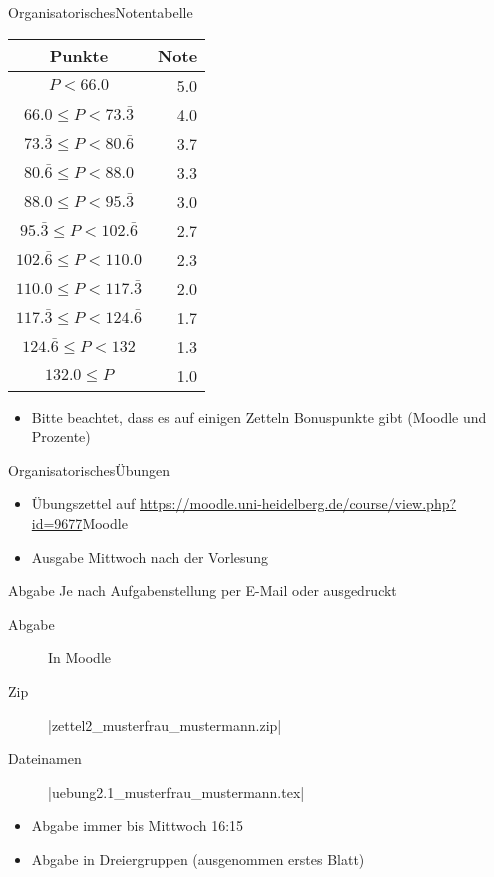 \documentclass[
	vorläufig=false,
	datum=2021-10-20,
	titel={Einführung und grundlegende Bedienung},
	web=true,
	max,
	aspectratio=1610,
]{../tex/latexkurs-slides}
\begin{document}
\begin{frame}[t]{Organisatorisches}{Notentabelle}
    \begin{table}[h!]
        \begin{center}
        \begin{tabular}{cr}
            \textbf{Punkte} & \textbf{Note}\\
            \hline
            \(P < 66.0\) & 5.0\\
            \(66.0 \leq P < 73.\bar{3}\) & 4.0\\
            \(73.\bar{3} \leq P < 80.\bar{6}\) & 3.7\\
            \(80.\bar{6} \leq P < 88.0\) & 3.3\\
            \(88.0 \leq P < 95.\bar{3}\) & 3.0\\
            \(95.\bar{3} \leq P < 102.\bar{6}\) & 2.7\\
            \(102.\bar{6} \leq P < 110.0\) & 2.3\\
            \(110.0 \leq P < 117.\bar{3}\) & 2.0\\
            \(117.\bar{3} \leq P < 124.\bar{6}\) & 1.7\\
            \(124.\bar{6} \leq P < 132\) & 1.3\\
            \(132.0 \leq P\) & 1.0
        \end{tabular}
        \end{center}
    \end{table}
    \begin{itemize}
        \item Bitte beachtet, dass es auf einigen Zetteln Bonuspunkte gibt (Moodle und Prozente)
    \end{itemize}
\end{frame}

\begin{frame}[fragile, t]{Organisatorisches}{Übungen}
	\begin{itemize}
		\item Übungszettel auf \url{https://moodle.uni-heidelberg.de/course/view.php?id=9677}{Moodle}
		\item Ausgabe Mittwoch nach der Vorlesung
	\end{itemize}
	\pause
	\begin{block}{Abgabe}
	Je nach Aufgabenstellung per E-Mail oder ausgedruckt
		\begin{description}
			\item[Abgabe]       In Moodle\\
			\item[Zip]          |zettel2_musterfrau_mustermann.zip|\\
			\item[Dateinamen]   |uebung2.1_musterfrau_mustermann.tex|
		\end{description}
		\begin{itemize}
			\item Abgabe immer bis Mittwoch 16:15
			\item Abgabe in Dreiergruppen (ausgenommen erstes Blatt)
		\end{itemize}
	\end{block}
\end{frame}
\end{document}
